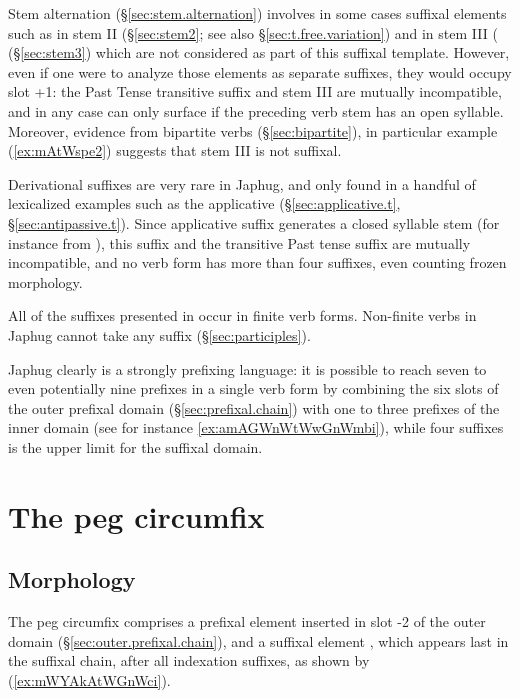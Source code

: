 Stem alternation (§\ref{sec:stem.alternation}) involves in some cases suffixal elements such as  in stem II (§\ref{sec:stem2}; see also §\ref{sec:t.free.variation}) and  in stem III ( (§\ref{sec:stem3}) which are not considered as part of this suffixal template. However, even if one were to analyze those elements as separate suffixes, they would occupy slot +1: the  Past Tense transitive suffix and stem III are mutually incompatible, and in any case  can only surface if the preceding verb stem has an open syllable. Moreover, evidence from bipartite verbs (§\ref{sec:bipartite}), in particular example (\ref{ex:mAtWspe2}) suggests that stem III is not suffixal.

Derivational suffixes are very rare in Japhug, and only found in a handful of lexicalized examples such as the  applicative (§\ref{sec:applicative.t}, §\ref{sec:antipassive.t}). Since applicative suffix generates a closed syllable stem (for instance  from ), this suffix and the transitive Past tense  suffix are mutually incompatible, and no verb form has more than four suffixes, even counting frozen morphology.

All of the suffixes presented in  occur in finite verb forms. Non-finite verbs in Japhug cannot take any suffix (§\ref{sec:participles}).

Japhug clearly is a strongly prefixing language: it is possible to reach seven to even potentially nine prefixes in a single verb form by combining the six slots of the outer prefixal domain (§\ref{sec:prefixal.chain}) with one to three prefixes of the inner domain (see for instance \ref{ex:amAGWnWtWwGnWmbi}), while four suffixes is the upper limit for the suffixal domain. 

\section{The peg circumfix} \label{sec:peg.circumfix}

\subsection{Morphology}
The peg circumfix  comprises a prefixal element  inserted in slot -2 of the outer domain (§\ref{sec:outer.prefixal.chain}), and a suffixal element , which appears last in the suffixal chain, after all indexation suffixes, as shown by (\ref{ex:mWYAkAtWGnWci}).

